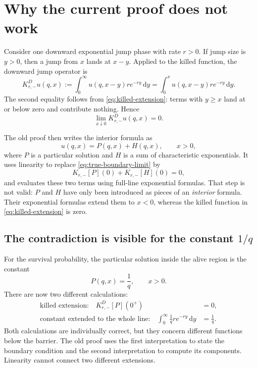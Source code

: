 \documentclass[11pt]{article}
\newcommand{\diff}{\mathrm{d}}
\theoremstyle{plain}
\theoremstyle{remark}
\begin{document}
\section{Why the current proof does not work}

Consider one downward exponential jump phase with rate $r>0$.  If jump size is
$y>0$, then a jump from $x$ lands at $x-y$.  Applied to the killed function,
the downward jump operator is
\begin{equation}\label{eq:old-killed-op}
K_{r,-}^{D}u(q,x)
:=\int_0^\infty u(q,x-y)r e^{-ry}\,\diff y
=\int_0^x u(q,x-y)r e^{-ry}\,\diff y.
\end{equation}
The second equality follows from \eqref{eq:killed-extension}: terms with
$y\geq x$ land at or below zero and contribute nothing.  Hence
\begin{equation}\label{eq:true-boundary-limit}
\lim_{x\downarrow0}K_{r,-}^{D}u(q,x)=0.
\end{equation}

The old proof then writes the interior formula as
\[
u(q,x)=P(q,x)+H(q,x),\qquad x>0,
\]
where $P$ is a particular solution and $H$ is a sum of characteristic
exponentials.  It uses linearity to replace
\eqref{eq:true-boundary-limit} by
\[
K_{r,-}[P](0)+K_{r,-}[H](0)=0,
\]
and evaluates these two terms using full-line exponential formulas.  That step
is not valid: $P$ and $H$ have only been introduced as pieces of an
\emph{interior} formula.  Their exponential formulas extend them to $x<0$,
whereas the killed function in \eqref{eq:killed-extension} is zero.

\subsection*{The contradiction is visible for the constant $1/q$}

For the survival probability, the particular solution inside the alive region
is the constant
\[
P(q,x)=\frac1q,\qquad x>0.
\]
There are now two different calculations:
\begin{align*}
\text{killed extension:}\quad
K_{r,-}^{D}[P](0^+)&=0,\\
\text{constant extended to the whole line:}\quad
\int_0^\infty \frac1q r e^{-ry}\,\diff y&=\frac1q.
\end{align*}
Both calculations are individually correct, but they concern different
functions below the barrier.  The old proof uses the first interpretation to
state the boundary condition and the second interpretation to compute its
components.  Linearity cannot connect two different extensions.
\end{document}
